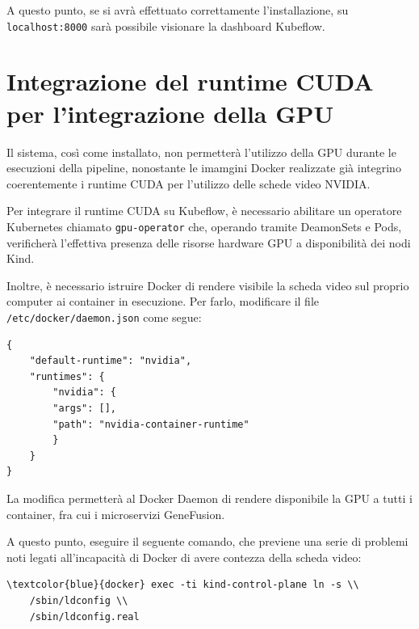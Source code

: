 A questo punto, se si avrà effettuato correttamente l'installazione, su {\small \verb|localhost:8000|} sarà possibile visionare la dashboard Kubeflow.

\section{Integrazione del runtime CUDA per l'integrazione della GPU}

Il sistema, così come installato, non permetterà l'utilizzo della GPU durante le esecuzioni della pipeline, nonostante le imamgini Docker realizzate già integrino coerentemente i runtime CUDA per l'utilizzo delle schede video NVIDIA.

Per integrare il runtime CUDA su Kubeflow, è necessario abilitare un operatore Kubernetes chiamato {\small \verb|gpu-operator|} che, operando tramite DeamonSets e Pods, verificherà l'effettiva presenza delle risorse hardware GPU a disponibilità dei nodi Kind.

Inoltre, è necessario istruire Docker di rendere visibile la scheda video sul proprio computer ai container in esecuzione. Per farlo, modificare il file {\small \verb|/etc/docker/daemon.json|} come segue:

\begin{code}
\label{code:apx:a:json}
\begin{verbatim}
{
    "default-runtime": "nvidia",
    "runtimes": {
        "nvidia": {
        "args": [],
        "path": "nvidia-container-runtime"
        }
    }
}
\end{verbatim}
\end{code}

La modifica permetterà al Docker Daemon di rendere disponibile la GPU a tutti i container, fra cui i microservizi GeneFusion.

A questo punto, eseguire il seguente comando, che previene una serie di problemi noti legati all'incapacità di Docker di avere contezza della scheda video:

\begin{small}
\begin{Verbatim}[commandchars=\\\{\}]
\textcolor{blue}{docker} exec -ti kind-control-plane ln -s \\
    /sbin/ldconfig \\
    /sbin/ldconfig.real
\end{Verbatim}
\end{small}

